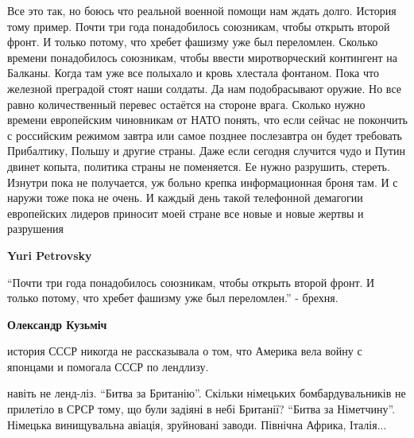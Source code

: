  
 
 
 
 
\zzSecCmt

\begin{itemize} %

Все это так, но боюсь что реальной военной помощи нам ждать долго. История тому
пример. Почти три года понадобилось союзникам, чтобы открыть второй фронт. И
только потому, что хребет фашизму уже был переломлен. Сколько времени
понадобилось союзникам, чтобы ввести миротворческий контингент на Балканы.
Когда там уже все полыхало и кровь хлестала фонтаном. Пока что железной
преградой стоят наши солдаты. Да нам подобрасывают оружие. Но все равно
количественный перевес остаётся на стороне врага. Сколько нужно времени
европейским чиновникам от НАТО понять, что если сейчас не покончить с
российским режимом завтра или самое позднее послезавтра он будет требовать
Прибалтику, Польшу и другие страны. Даже если сегодня случится чудо и Путин
двинет копыта, политика страны не поменяется. Ее нужно разрушить, стереть.
Изнутри пока не получается, уж больно крепка информационная броня там. И с
наружи тоже пока не очень. И каждый день такой телефонной демагогии европейских
лидеров приносит моей стране все новые и новые жертвы и разрушения

\begin{itemize} %
\textbf{Yuri Petrovsky} 

\enquote{Почти три года понадобилось союзникам, чтобы открыть второй фронт. И только
потому, что хребет фашизму уже был переломлен.} - брехня.

\begin{itemize} %
\textbf{Олександр Кузьміч} 

история СССР никогда не рассказывала о том, что Америка вела войну с японцами и
помогала СССР по лендлизу.


навіть не ленд-ліз. \enquote{Битва за Британію}. Скільки німецьких бомбардувальників не
прилетіло в СРСР тому, що були задіяні в небі Британії? \enquote{Битва за Німетчину}.
Німецька винищувальна авіація, зруйновані заводи. Північна Африка, Італія...


\end{itemize}
\end{itemize}
\end{itemize}
